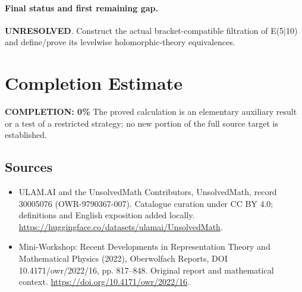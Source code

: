 \documentclass[11pt]{article}
\begin{document}
\paragraph{Final status and first remaining gap.}
\textbf{UNRESOLVED}. Construct the actual bracket-compatible filtration of E(5|10) and define/prove its levelwise holomorphic-theory equivalences.

\section{Completion Estimate}
\noindent\textbf{COMPLETION: 0\%}
The proved calculation is an elementary auxiliary result or a test of a restricted strategy; no new portion of the full source target is established.

\subsection{Sources}
\begin{itemize}
\item[\hypertarget{source:30005076:1}{S1}] ULAM.AI and the UnsolvedMath Contributors, UnsolvedMath, record 30005076 (OWR-9790367-007). Catalogue curation under CC BY 4.0; definitions and English exposition added locally.
\url{https://huggingface.co/datasets/ulamai/UnsolvedMath}.
\item[\hypertarget{source:30005076:2}{S2}] Mini-Workshop: Recent Developments in Representation Theory and Mathematical Physics (2022), Oberwolfach Reports, DOI 10.4171/owr/2022/16, pp. 817--848. Original report and mathematical context.
\url{https://doi.org/10.4171/owr/2022/16}.
\end{itemize}
\label{end:30005076}
\end{document}
